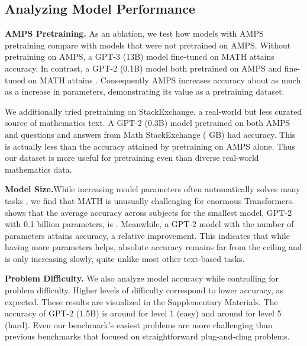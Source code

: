 \documentclass{article}
\begin{document}
\subsection{Analyzing Model Performance}

\textbf{AMPS Pretraining.}\quad 
As an ablation, we test how models with AMPS pretraining compare with models that were not pretrained on AMPS.
Without pretraining on AMPS, a GPT-3 (13B) model fine-tuned on MATH attains  accuracy. In contrast, a GPT-2 (0.1B) model both pretrained on AMPS and fine-tuned on MATH attains . 
Consequently AMPS increases accuracy about as much as a  increase in parameters, demonstrating its value as a pretraining dataset.

We additionally tried pretraining on StackExchange, a real-world but less  curated source of mathematics text. 
A GPT-2 (0.3B) model pretrained on both AMPS and questions and answers from Math StackExchange ( GB) had  accuracy. This is actually less than the  accuracy attained by pretraining on AMPS alone. Thus our dataset is more useful for pretraining even than diverse real-world mathematics data.


\textbf{Model Size.}\quad While increasing model parameters often automatically solves many tasks \citep{Brown2020LanguageMA}, we find that MATH is unusually challenging for enormous Transformers.  shows that the average accuracy across subjects for the smallest model, GPT-2 with 0.1 billion parameters, is . Meanwhile, a GPT-2 model with  the number of parameters attains  accuracy, a  relative improvement. This indicates that while having more parameters helps, absolute accuracy remains far from the ceiling and is only increasing slowly, quite unlike most other text-based tasks. 

\textbf{Problem Difficulty.}\quad
We also analyze model accuracy while controlling for problem difficulty. Higher levels of difficulty correspond to lower accuracy, as expected. These results are visualized in the Supplementary Materials. The accuracy of GPT-2 (1.5B) is around  for level 1 (easy) and around  for level 5 (hard). Even our benchmark's easiest problems 
are more challenging than previous benchmarks that focused on straightforward plug-and-chug problems.
\end{document}
